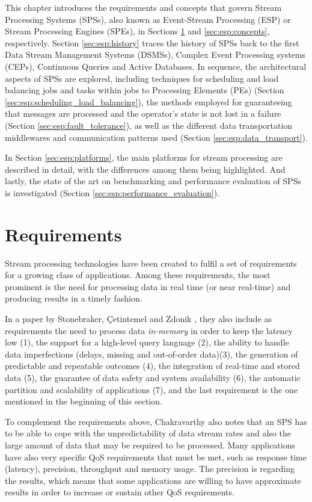 \documentclass[ppgc,diss,english]{iiufrgs}
\begin{document}
This chapter introduces the requirements and concepts that govern Stream Processing Systems (SPSs), also known as Event-Stream Processing (ESP) or Stream Processing Engines (SPEs), in Sections \ref{sec:esp:requirements} and \ref{sec:esp:concepts}, respectively. Section \ref{sec:esp:history} traces the history of SPSs back to the first Data Stream Management Systems (DSMSs), Complex Event Processing systems (CEPs), Continuous Queries and Active Databases. In sequence, the architectural aspects of SPSs are explored, including techniques for scheduling and load balancing jobs and tasks within jobs to Processing Elements (PEs) (Section \ref{sec:esp:scheduling_load_balancing}), the methods employed for guaranteeing that messages are processed and the operator's state is not lost in a failure (Section \ref{sec:esp:fault_tolerance}), as well as the different data transportation middlewares and communication patterns used (Section \ref{sec:esp:data_transport}).

In Section \ref{sec:esp:platforms}, the main platforms for stream processing are described in detail, with the differences among them being highlighted. And lastly, the state of the art on benchmarking and performance evaluation of SPSs is investigated (Section \ref{sec:esp:performance_evaluation}).

\section{Requirements}
\label{sec:esp:requirements}

Stream processing technologies have been created to fulfil a set of requirements for a growing class of applications. Among these requirements, the most prominent is the need for processing data in real time (or near real-time) and producing results in a timely fashion.

In a paper by Stonebraker, {\c{C}}etintemel and Zdonik \cite{stonebraker20058}, they also include as requirements the need to process data \emph{in-memory} in order to keep the latency low (1), the support for a high-level query language (2), the ability to handle data imperfections (delays, missing and out-of-order data)(3), the generation of predictable and repeatable outcomes (4), the integration of real-time and stored data (5), the guarantee of data safety and system availability (6), the automatic partition and scalability of applications (7), and the last requirement is the one mentioned in the beginning of this section.

To complement the requirements above, Chakravarthy \cite{chakravarthy2009stream} also notes that an SPS has to be able to cope with the unpredictability of data stream rates and also the large amount of data that may be required to be processed. Many applications have also very specific QoS requirements that must be met, such as response time (latency), precision, throughput and memory usage. The precision is regarding the results, which means that some applications are willing to have approximate results in order to increase or sustain other QoS requirements.
\end{document}
